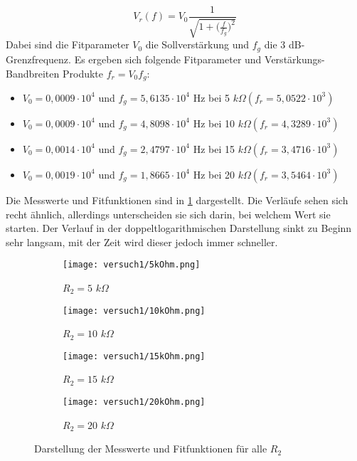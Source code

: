 \begin{equation}\label{eqn:formel2}
    V_r(f)=V_0\frac{1}{\sqrt{1+\biggl(\frac{f}{f_g}\biggr)^2}}
\end{equation}
Dabei sind die Fitparameter $V_0$ die Sollverstärkung und $f_g$ die 3 dB-Grenzfrequenz. Es ergeben sich folgende Fitparameter und Verstärkungs-Bandbreiten Produkte $f_r=V_0f_g$:
\begin{itemize}[noitemsep,nosep]
	\item $V_0=0,0009 \cdot10^4$ und $f_g=5,6135 \cdot10^4$ Hz bei 5 $k\Omega (f_r=5,0522 \cdot 10^3)$
	\item $V_0=0,0009 \cdot10^4$ und $f_g=4,8098 \cdot10^4$ Hz bei 10 $k\Omega (f_r=4,3289 \cdot 10^3)$
	\item $V_0=0,0014 \cdot10^4$ und $f_g=2,4797 \cdot10^4$ Hz bei 15 $k\Omega (f_r=3,4716 \cdot 10^3)$
	\item $V_0=0,0019 \cdot10^4$ und $f_g=1,8665 \cdot10^4$ Hz bei 20 $k\Omega (f_r=3,5464 \cdot 10^3)$
\end{itemize}
Die Messwerte und Fitfunktionen sind in \ref{fig:graphen} dargestellt. Die Verläufe sehen sich recht ähnlich, allerdings unterscheiden sie sich darin, bei welchem Wert sie starten. Der Verlauf in der doppeltlogarithmischen Darstellung sinkt zu Beginn sehr langsam, mit der Zeit wird dieser jedoch immer schneller.
\begin{figure}
    \centering
    \begin{subfigure}[t]{0.45\linewidth}
        \centering
		\texttt{[image: versuch1/5kOhm.png]}
		\caption{$R_2=5$ $k \Omega$}
    \end{subfigure}
\hfill
     \begin{subfigure}[t]{0.45\linewidth}
        \centering
		\texttt{[image: versuch1/10kOhm.png]}
		\caption{$R_2=10$ $k \Omega$}
    \end{subfigure}

     \begin{subfigure}[t]{0.45\linewidth}
        \centering
		\texttt{[image: versuch1/15kOhm.png]}
		\caption{$R_2=15$ $k \Omega$}
    \end{subfigure}
\hfill
     \begin{subfigure}[t]{0.45\linewidth}
        \centering
		\texttt{[image: versuch1/20kOhm.png]}
		\caption{$R_2=20$ $k \Omega$}
    \end{subfigure}
    \caption{Darstellung der Messwerte und Fitfunktionen für alle $R_2$}
    \label{fig:graphen}
\end{figure}